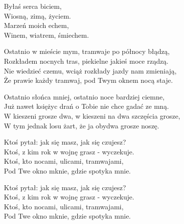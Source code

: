 \begin{text}
    \vin Byłaś serca biciem,\\
    \vin Wiosną, zimą, życiem.\\
    \vin Marzeń moich echem,\\
    \vin Winem, wiatrem, śmiechem.

    Ostatnio w mieście mym, tramwaje po północy błądzą,\\
    Rozkładem nocnych tras, piekielne jakieś moce rządzą.\\
    Nie wiedzieć czemu, wciąż rozkłady jazdy nam zmieniają,\\
    Że prawie każdy tramwaj, pod Twym oknem nocą staje.

    Ostatnio słońca mniej, ostatnio noce bardziej ciemne,\\
    Już nawet księżyc drań o Tobie nie chce gadać ze mną.\\
    W kieszeni grosze dwa, w kieszeni na dwa szczęścia grosze,\\
    W tym jednak losu żart, że ja obydwa grosze noszę.

    Ktoś pytał: jak się masz, jak się czujesz?\\
    Ktoś, z kim rok w wojnę grasz - wyczekuje.\\
    Ktoś, kto nocami, ulicami, tramwajami,\\
    Pod Twe okno mknie, gdzie spotyka mnie.

    Ktoś pytał: jak się masz, jak się czujesz?\\
    Ktoś, z kim rok w wojnę grasz - wyczekuje.\\
    Ktoś, kto nocami, ulicami, tramwajami,\\
    Pod Twe okno mknie, gdzie spotyka mnie.
\end{text}
\begin{chord}

\end{chord}